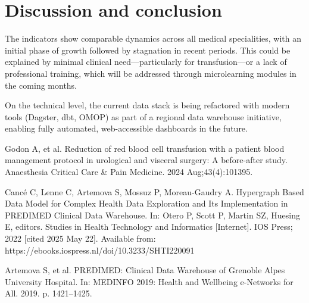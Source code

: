 \documentclass{IOS-Book-Article}
\begin{document}
\section{Discussion and conclusion}

The indicators show comparable dynamics across all medical specialities, with an initial phase of growth followed by stagnation in recent periods. This could be explained by minimal clinical need—particularly for transfusion—or a lack of professional training, which will be addressed through microlearning modules in the coming months.

On the technical level, the current data stack is being refactored with modern tools (Dagster, dbt, OMOP) as part of a regional data warehouse initiative, enabling fully automated, web-accessible dashboards in the future.

\begin{thebibliography}{99}

Godon A, et al. Reduction of red blood cell transfusion with a patient blood management protocol in urological and visceral surgery: A before-after study. Anaesthesia Critical Care \& Pain Medicine. 2024 Aug;43(4):101395.

Cancé C, Lenne C, Artemova S, Mossuz P, Moreau-Gaudry A. Hypergraph
Based Data Model for Complex Health Data Exploration and Its Implementation in PREDIMED
Clinical Data Warehouse. In: Otero P, Scott P, Martin SZ, Huesing E, editors. Studies in Health
Technology and Informatics [Internet]. IOS Press; 2022 [cited 2025 May 22]. Available from:
https://ebooks.iospress.nl/doi/10.3233/SHTI220091

Artemova S, et al. PREDIMED: Clinical Data Warehouse of Grenoble Alpes University Hospital. In: MEDINFO 2019: Health and Wellbeing e-Networks for All. 2019. p. 1421--1425.



\end{thebibliography}
\end{document}
